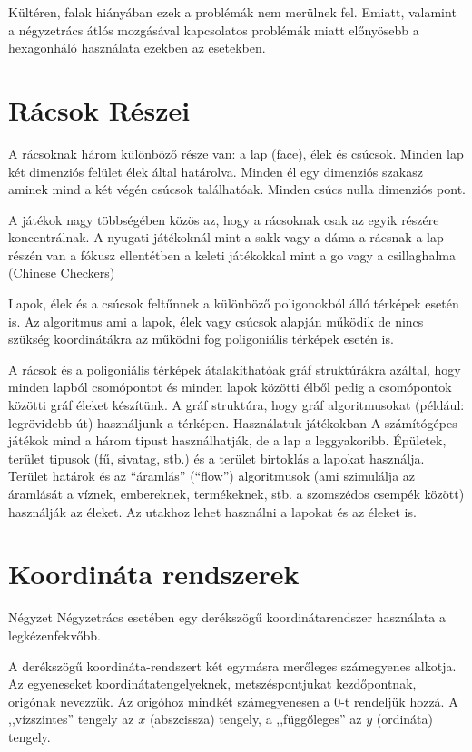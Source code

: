 Kültéren, falak hiányában ezek a problémák nem merülnek fel. Emiatt, valamint a négyzetrács átlós mozgásával kapcsolatos problémák miatt előnyösebb a hexagonháló használata ezekben az esetekben.

\section{Rácsok Részei}

A rácsoknak három különböző része van: a lap (face), élek és csúcsok. Minden lap két dimenziós felület élek által határolva. Minden él egy dimenziós szakasz aminek mind a két végén csúcsok találhatóak. Minden csúcs nulla dimenziós pont. 

A játékok nagy többségében közös az, hogy a rácsoknak csak az egyik részére koncentrálnak. A nyugati játékoknál mint a sakk vagy a dáma a rácsnak a lap részén van a fókusz ellentétben a keleti játékokkal mint a go vagy a csillaghalma (Chinese Checkers) 

Lapok, élek és a csúcsok feltűnnek a különböző poligonokból álló  térképek esetén is. Az algoritmus ami a lapok, élek vagy csúcsok alapján működik de nincs szükség koordinátákra az működni fog poligoniális térképek esetén is.

A rácsok és a poligoniális térképek átalakíthatóak gráf struktúrákra azáltal, hogy minden lapból csomópontot és minden lapok közötti élből pedig a csomópontok közötti gráf éleket készítünk. A gráf struktúra, hogy gráf algoritmusokat (például: legrövidebb út) használjunk a térképen.
Használatuk játékokban
A számítógépes játékok mind a három tipust használhatják, de a lap a leggyakoribb. Épületek, terület tipusok (fű, sivatag, stb.) és a terület birtoklás a lapokat használja. Terület határok és az “áramlás” (“flow”) algoritmusok (ami szimulálja az áramlását a víznek, embereknek, termékeknek, stb. a szomszédos csempék között) használják az éleket. Az utakhoz lehet használni a lapokat és az éleket is.

\section{Koordináta rendszerek}

Négyzet
Négyzetrács esetében egy derékszögű koordinátarendszer használata a legkézenfekvőbb. 

A derékszögű koordináta-rendszert két egymásra merőleges számegyenes alkotja. Az egyeneseket koordinátatengelyeknek, metszéspontjukat kezdőpontnak, origónak nevezzük. Az origóhoz mindkét számegyenesen a 0-t rendeljük hozzá. A ,,vízszintes'' tengely az $x$ (abszcissza) tengely, a ,,függőleges'' az $y$ (ordináta) tengely.

